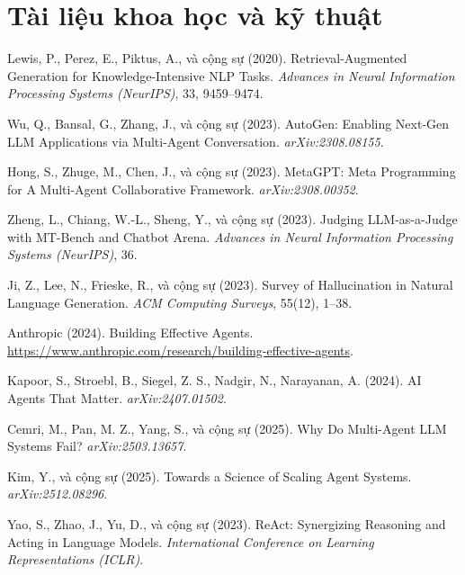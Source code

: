 \newcommand{\nguon}[2]{\par\noindent\hangindent=1.1cm\hangafter=1\hypertarget{src-#1}{}\makebox[1.1cm][l]{[#1]}#2\par\vspace{5pt}}

\section*{Tài liệu khoa học và kỹ thuật}

\nguon{1}{Lewis, P., Perez, E., Piktus, A., và cộng sự (2020). Retrieval-Augmented Generation for Knowledge-Intensive NLP Tasks. \textit{Advances in Neural Information Processing Systems (NeurIPS)}, 33, 9459--9474.}

\nguon{2}{Wu, Q., Bansal, G., Zhang, J., và cộng sự (2023). AutoGen: Enabling Next-Gen LLM Applications via Multi-Agent Conversation. \textit{arXiv:2308.08155}.}

\nguon{3}{Hong, S., Zhuge, M., Chen, J., và cộng sự (2023). MetaGPT: Meta Programming for A Multi-Agent Collaborative Framework. \textit{arXiv:2308.00352}.}

\nguon{4}{Zheng, L., Chiang, W.-L., Sheng, Y., và cộng sự (2023). Judging LLM-as-a-Judge with MT-Bench and Chatbot Arena. \textit{Advances in Neural Information Processing Systems (NeurIPS)}, 36.}

\nguon{5}{Ji, Z., Lee, N., Frieske, R., và cộng sự (2023). Survey of Hallucination in Natural Language Generation. \textit{ACM Computing Surveys}, 55(12), 1--38.}

\nguon{6}{Anthropic (2024). Building Effective Agents. \url{https://www.anthropic.com/research/building-effective-agents}.}

\nguon{7}{Kapoor, S., Stroebl, B., Siegel, Z. S., Nadgir, N., Narayanan, A. (2024). AI Agents That Matter. \textit{arXiv:2407.01502}.}

\nguon{8}{Cemri, M., Pan, M. Z., Yang, S., và cộng sự (2025). Why Do Multi-Agent LLM Systems Fail? \textit{arXiv:2503.13657}.}

\nguon{9}{Kim, Y., và cộng sự (2025). Towards a Science of Scaling Agent Systems. \textit{arXiv:2512.08296}.}

\nguon{10}{Yao, S., Zhao, J., Yu, D., và cộng sự (2023). ReAct: Synergizing Reasoning and Acting in Language Models. \textit{International Conference on Learning Representations (ICLR)}.}


